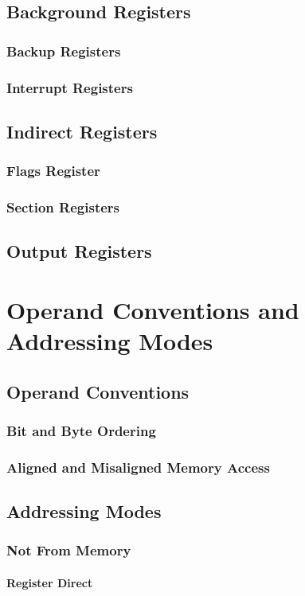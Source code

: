 \documentclass[oneside, a4paper]{memoir}
\begin{document}
\section{Background Registers}
\subsection{Backup Registers}
\subsection{Interrupt Registers}
\section{Indirect Registers}
\subsection{Flags Register}
\subsection{Section Registers}
\section{Output Registers}

\chapter{Operand Conventions and Addressing Modes}
\section{Operand Conventions}
\subsection{Bit and Byte Ordering}
\subsection{Aligned and Misaligned Memory Access}
\section{Addressing Modes}
\subsection{Not From Memory}
\subsubsection{Register Direct}
\end{document}
